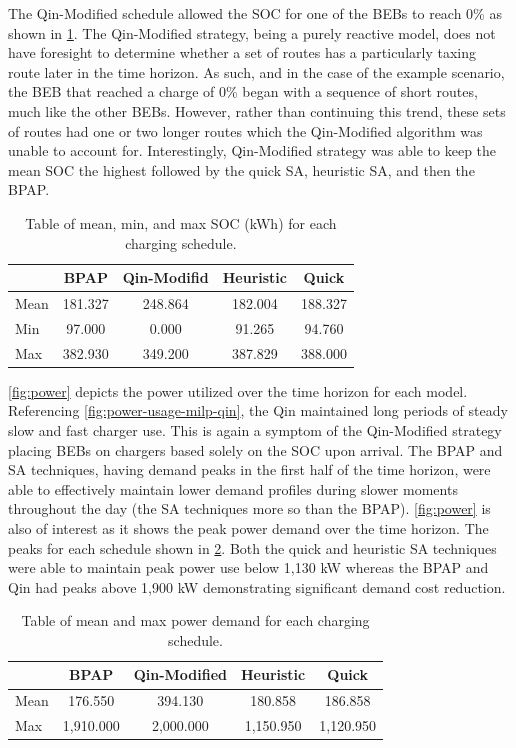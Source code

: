 \documentclass[energies,article,submit,moreauthors]{Definitions/mdpi}
\begin{document}
The Qin-Modified schedule allowed the SOC for one of the BEBs to reach 0\% as shown in \ref{tab:charge}. The Qin-Modified
strategy, being a purely reactive model, does not have foresight to determine whether a set of routes has a particularly
taxing route later in the time horizon. As such, and in the case of the example scenario, the BEB that reached a charge
of 0\% began with a sequence of short routes, much like the other BEBs. However, rather than continuing this trend, these
sets of routes had one or two longer routes which the Qin-Modified algorithm was unable to account for. Interestingly,
Qin-Modified strategy was able to keep the mean SOC the highest followed by the quick SA, heuristic SA, and then the
BPAP.

\begin{table}[htbp]
\caption{\label{tab:charge}Table of mean, min, and max SOC (kWh) for each charging schedule.}
\centering
\begin{tabular}{l|cccc}
\hline
 & BPAP & Qin-Modifid & Heuristic & Quick\\[0pt]
\hline
Mean & 181.327 & 248.864 & 182.004 & 188.327\\[0pt]
Min & 97.000 & 0.000 & 91.265 & 94.760\\[0pt]
Max & 382.930 & 349.200 & 387.829 & 388.000\\[0pt]
\hline
\end{tabular}
\end{table}

\ref{fig:power} depicts the power utilized over the time horizon for each model. Referencing
\ref{fig:power-usage-milp-qin}, the Qin maintained long periods of steady slow and fast charger use. This is again a
symptom of the Qin-Modified strategy placing BEBs on chargers based solely on the SOC upon arrival. The BPAP and SA
techniques, having demand peaks in the first half of the time horizon, were able to effectively maintain lower demand
profiles during slower moments throughout the day (the SA techniques more so than the BPAP). \ref{fig:power} is also of
interest as it shows the peak power demand over the time horizon. The peaks for each schedule shown in \ref{tab:power}.
Both the quick and heuristic SA techniques were able to maintain peak power use below 1,130 kW whereas the BPAP and Qin
had peaks above 1,900 kW demonstrating significant demand cost reduction.

\begin{table}[htbp]
\caption{\label{tab:power}Table of mean and max power demand for each charging schedule.}
\centering
\begin{tabular}{l|cccc}
\hline
 & BPAP & Qin-Modified & Heuristic & Quick\\[0pt]
\hline
Mean & 176.550 & 394.130 & 180.858 & 186.858\\[0pt]
Max & 1,910.000 & 2,000.000 & 1,150.950 & 1,120.950\\[0pt]
\hline
\end{tabular}
\end{table}
\end{document}
